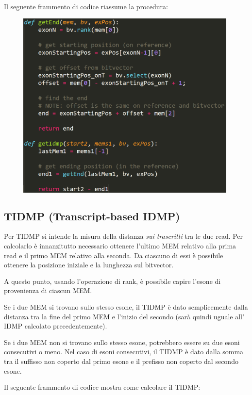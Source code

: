 Il seguente frammento di codice riassume la procedura:

\begin{figure}[h!]
	\centering
	\includegraphics[width=\linewidth, height=9.5cm]{images/getIDMP.png}
  \label{fig:GetIDMP}
\end{figure}

\newpage

\subsection{TIDMP (Transcript-based IDMP)}
Per TIDMP si intende la misura della distanza \textit{sui trascritti} tra le due read. Per calcolarlo è innanzitutto necessario ottenere l'ultimo MEM relativo alla prima read e il primo MEM relativo alla seconda. Da ciascuno di essi è possibile ottenere la posizione iniziale e la lunghezza sul bitvector. 

A questo punto, usando l'operazione di rank, è possibile capire l'esone di provenienza di ciascun MEM.

Se i due MEM si trovano sullo stesso esone, il TIDMP è dato semplicemente dalla distanza tra la fine del primo MEM e l'inizio del secondo (sarà quindi uguale all' IDMP calcolato precedentemente).

Se i due MEM non si trovano sullo stesso esone, potrebbero essere su due esoni consecutivi o meno. Nel caso di esoni consecutivi, il TIDMP è dato dalla somma tra il suffisso non coperto dal primo esone e il prefisso non coperto dal secondo esone.

Il seguente frammento di codice mostra come calcolare il TIDMP:

